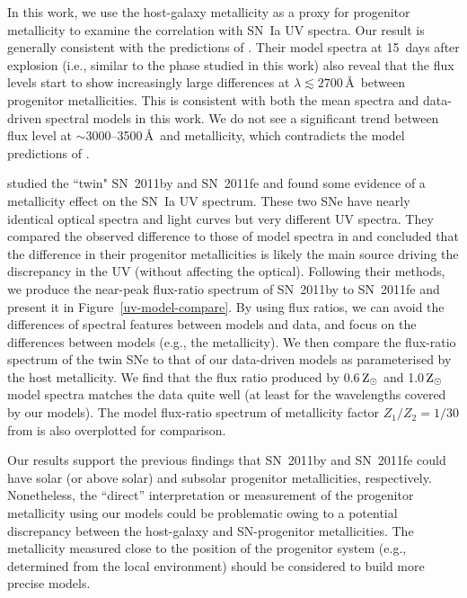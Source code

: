 \documentclass[useAMS,usenatbib]{mn2e}
\begin{document}
In this work, we use the host-galaxy metallicity as a proxy for progenitor metallicity to examine the correlation with SN~Ia UV spectra. Our result is generally consistent with the predictions of \citet{2000ApJ...530..966L}. Their model spectra at 15~days after explosion (i.e., similar to the phase studied in this work) also reveal that the flux levels start to show increasingly large differences at $\lambda\lesssim2700$\,\AA\ between progenitor metallicities. This is consistent with both the mean spectra and data-driven spectral models in this work. We do not see a significant trend between flux level at $\sim3000$--3500\,\AA\ and metallicity, which contradicts the model predictions of \citet{2012MNRAS.427..103W}.

\citet{2013ApJ...769L...1F} studied the ``twin" SN~2011by and SN~2011fe and found some evidence of a metallicity effect on the SN~Ia UV spectrum. These two SNe have nearly identical optical spectra and light curves but very different UV spectra. They compared the observed difference to those of model spectra in \citet{2000ApJ...530..966L} and concluded that the difference in their progenitor metallicities is likely the main source driving the discrepancy in the UV (without affecting the optical). Following their methods, we produce the near-peak flux-ratio spectrum of SN~2011by to SN~2011fe and present it in Figure~\ref{uv-model-compare}. By using flux ratios, we can avoid the differences of spectral features between models and data, and focus on the differences between models (e.g., the metallicity). We then compare the flux-ratio spectrum of the twin SNe to that of our data-driven models as parameterised by the host metallicity. We find that the flux ratio produced by 0.6\,$\rm Z_{\odot}$ and 1.0\,$\rm Z_{\odot}$ \citep[using the solar value of 8.69;][]{2001ApJ...556L..63A} model spectra matches the data quite well (at least for the wavelengths covered by our models). The model flux-ratio spectrum of metallicity factor $Z_{1}/Z_{2}=1/30$ from \citet{2000ApJ...530..966L} is also overplotted for comparison.

Our results support the previous findings that SN~2011by and SN~2011fe could have solar (or above solar) and subsolar progenitor metallicities, respectively. Nonetheless, the ``direct'' interpretation or measurement of the progenitor metallicity using our models could be problematic owing to a potential discrepancy between the host-galaxy and SN-progenitor metallicities. The metallicity measured close to the position of the progenitor system (e.g., determined from the local environment) should be considered to build more precise models.
\end{document}
